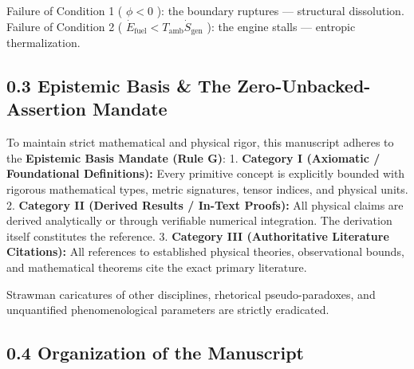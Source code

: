 \documentclass[11pt,a4paper]{article}
\theoremstyle{definition}\newtheorem{definition}{Definition}
\theoremstyle{remark}\newtheorem{remark}{Remark}
\begin{document}
Failure of Condition 1 ( $\phi < 0$ ): the boundary ruptures — structural dissolution.
Failure of Condition 2 ( $\dot{E}_{\text{fuel}} < T_{\text{amb}}\dot{S}_{\text{gen}}$ ): the engine stalls — entropic thermalization.
\subsection{0.3 Epistemic Basis \& The Zero-Unbacked-Assertion Mandate}

To maintain strict mathematical and physical rigor, this manuscript adheres to the \textbf{Epistemic Basis Mandate (Rule G)}:
1. \textbf{Category I (Axiomatic / Foundational Definitions):} Every primitive concept is explicitly bounded with rigorous mathematical types, metric signatures, tensor indices, and physical units.
2. \textbf{Category II (Derived Results / In-Text Proofs):} All physical claims are derived analytically or through verifiable numerical integration. The derivation itself constitutes the reference.
3. \textbf{Category III (Authoritative Literature Citations):} All references to established physical theories, observational bounds, and mathematical theorems cite the exact primary literature.

Strawman caricatures of other disciplines, rhetorical pseudo-paradoxes, and unquantified phenomenological parameters are strictly eradicated.
\subsection{0.4 Organization of the Manuscript}
\end{document}

